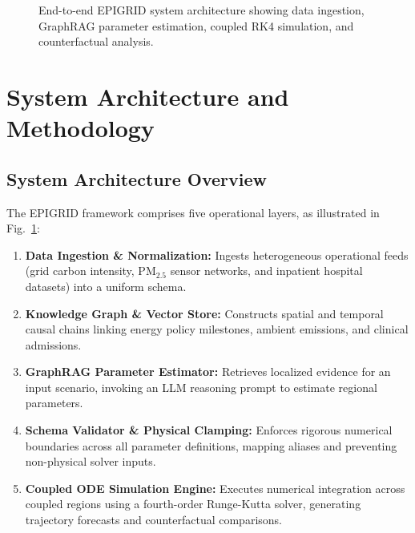 \documentclass[conference]{IEEEtran}
\renewcommand{\_}{\textunderscore\allowbreak{}}%
\begin{document}
\begin{figure}[!t]
\centering
{}
\caption{End-to-end EPIGRID system architecture showing data ingestion, GraphRAG parameter estimation, coupled RK4 simulation, and counterfactual analysis.}
\label{fig_arch}
\end{figure}

\section{System Architecture and Methodology}

\subsection{System Architecture Overview}
The EPIGRID framework comprises five operational layers, as illustrated in Fig.~\ref{fig_arch}:
\begin{enumerate}
    \item \textbf{Data Ingestion \& Normalization:} Ingests heterogeneous operational feeds (grid carbon intensity, PM$_{2.5}$ sensor networks, and inpatient hospital datasets) into a uniform schema.
    \item \textbf{Knowledge Graph \& Vector Store:} Constructs spatial and temporal causal chains linking energy policy milestones, ambient emissions, and clinical admissions.
    \item \textbf{GraphRAG Parameter Estimator:} Retrieves localized evidence for an input scenario, invoking an LLM reasoning prompt to estimate regional parameters.
    \item \textbf{Schema Validator \& Physical Clamping:} Enforces rigorous numerical boundaries across all parameter definitions, mapping aliases and preventing non-physical solver inputs.
    \item \textbf{Coupled ODE Simulation Engine:} Executes numerical integration across coupled regions using a fourth-order Runge-Kutta solver, generating trajectory forecasts and counterfactual comparisons.
\end{enumerate}
\end{document}
